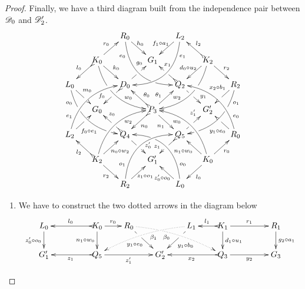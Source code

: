 \begin{proof}
		Finally, we have a third diagram built from the independence pair between $\mathscr{D}_0$ and $\mathscr{D}'_2$.
\[\xymatrix@C=15pt@R=15pt{&&R_0 \ar@/_.8cm/[ddrr]_(.2){e_0}|(.7)\hole
				\ar[dr]^{\hspace{-5pt}h_0}&& L_2\ar@/^.8cm/[ddll]^(.2){e_1}
				\ar[dl]_{f_1\circ a_1\hspace{-5pt}}\\&K_0\ar[dr]^{k_0}\ar@{>->}[dl]_{l_0}
				\ar@/_.6cm/[ddrr]|(.36)\hole^(.65){w_0}\ar[ur]^{r_0}&& G_1 &&
				K_2 \ar@/^.6cm/[ddll]|(.36)\hole_(.65){w_2}\ar[dl]_{d_0\circ
					u_2\hspace{-5pt}}\ar@{>->}[lu]_{l_2} \ar[dr]^{r_2}\\L_0
				\ar@/_.6cm/[ddrr]_(.2){o_0}|(.31)\hole|(.81)\hole
				\ar[dr]^(.4){m_0}|(.61)\hole && D_0
				\ar@{>->}[dl]|(.4)\hole_(.65){f_0}\ar[ur]|(.5)\hole^(.7){g_0}&&Q_2
				\ar[dr]|(.4)\hole^(.65){y_1}
				\ar@{>->}[ul]|(.5)\hole_(.65){x_1}&&R_2\ar@/^.6cm/[ddll]^(.2){o_1}|(.31)\hole|(.81)\hole\ar[dl]_(.3){x_2\circ
					b_1}|(.58)\hole \\&G_0 &&P_3\ar[dr]_{n_1}
				\ar@{>->}[dl]^{n_0}\ar[ur]^(.4){\theta_1}\ar@{>->}[ul]_(.4){\theta_0}&&G'_2\\L_2
				\ar@/^.6cm/[uurr]^(.2){e_1} \ar[ur]_(.35){f_0\circ
					e_1}|(.61)\hole&&Q_4
				\ar@{>->}[ul]|(.4)\hole_(.65){z_0}\ar[dr]|(.5)\hole^(.65){z'_0}
				&&Q_5\ar[ur]|(.4)\hole^(.65){z'_1}
				\ar@{>->}[dl]|(.5)\hole_(.65){z_1} && R_0 \ar[ul]^(.3){y_1\circ
					e_0}|(.6)\hole\ar@/_.6cm/[uull]_(.2){e_0}\\&K_2
				\ar[ur]_{\hspace{-2pt}n_0\circ w_2} \ar[dr]_{r_2}
				\ar@{>->}[ul]^{l_2}\ar@/^.6cm/[uurr]_(.65){w_2}&&G'_1&& K_0
				\ar[ur]_{r_0} \ar[ul]^{n_1\circ w_0} \ar[dl]^{l_0}
				\ar@/_.6cm/[uull]^(.65){w_0}\\&& R_2
				\ar[ur]_{\hspace{-4pt}z_1\circ
					o_1}\ar@/^.8cm/[uurr]^(.2){o_1}&& L_0 \ar[ul]^{z'_0\circ
					o_0\hspace{-7pt}} \ar@/_.8cm/[uull]_(.2){o_0} |(.69)\hole
			}\]
	\begin{enumerate}		
		\item We have to construct the two dotted arrows in the diagram
		below
		\[\xymatrix@C=20pt@R=20pt{L_0 \ar[d]_{z'_0\circ o_0}&& K_0
			\ar[d]_{n_1\circ w_0}\ar@{>->}[ll]_{l_0} \ar[r]^{r_0} & R_0
			\ar@{.>}@/^.25cm/[drrr]_(.4){\beta_0}|(.32)\hole
			\ar[dr]|(.33)\hole_{y_1\circ e_0} && L_1
			\ar@{.>}@/_.25cm/[dlll]^(.4){\beta_1}
			\ar[dl]|(.33)\hole^{y_1\circ b_0}& K_1 \ar[d]^{d_1\circ
				u_1}\ar@{>->}[l]_{l_1} \ar[rr]^{r_1} && R_1 \ar[d]^{g_2\circ
				a_1}\\G'_1 && \ar@{>->}[ll]^{z_1} Q_5 \ar[rr]_{z'_1}&& G'_2 &&
			\ar@{>->}[ll]^{x_2} Q_3 \ar[rr]_{y_2}&& G_3}\]
		

\end{enumerate}
\end{proof}

